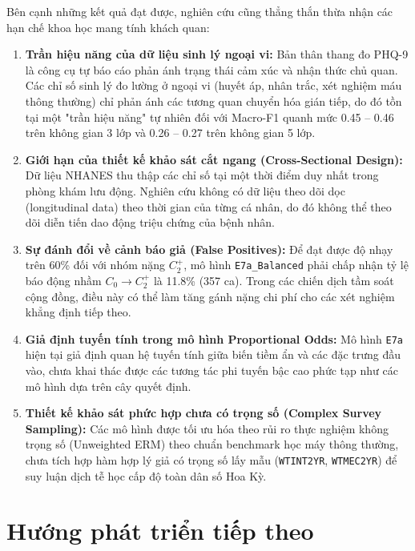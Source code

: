 Bên cạnh những kết quả đạt được, nghiên cứu cũng thẳng thắn thừa nhận các hạn chế khoa học mang tính khách quan:
\begin{enumerate}
    \item \textbf{Trần hiệu năng của dữ liệu sinh lý ngoại vi:} Bản thân thang đo PHQ-9 là công cụ tự báo cáo phản ánh trạng thái cảm xúc và nhận thức chủ quan. Các chỉ số sinh lý đo lường ở ngoại vi (huyết áp, nhân trắc, xét nghiệm máu thông thường) chỉ phản ánh các tương quan chuyển hóa gián tiếp, do đó tồn tại một "trần hiệu năng" tự nhiên đối với Macro-F1 quanh mức 0.45 -- 0.46 trên không gian 3 lớp và 0.26 -- 0.27 trên không gian 5 lớp.
    \item \textbf{Giới hạn của thiết kế khảo sát cắt ngang (Cross-Sectional Design):} Dữ liệu NHANES thu thập các chỉ số tại một thời điểm duy nhất trong phòng khám lưu động. Nghiên cứu không có dữ liệu theo dõi dọc (longitudinal data) theo thời gian của từng cá nhân, do đó không thể theo dõi diễn tiến dao động triệu chứng của bệnh nhân.
    \item \textbf{Sự đánh đổi về cảnh báo giả (False Positives):} Để đạt được độ nhạy trên 60\% đối với nhóm nặng $C_2^+$, mô hình \texttt{E7a\_Balanced} phải chấp nhận tỷ lệ báo động nhầm $C_0 \to C_2^+$ là 11.8\% (357 ca). Trong các chiến dịch tầm soát cộng đồng, điều này có thể làm tăng gánh nặng chi phí cho các xét nghiệm khẳng định tiếp theo.
    \item \textbf{Giả định tuyến tính trong mô hình Proportional Odds:} Mô hình \texttt{E7a} hiện tại giả định quan hệ tuyến tính giữa biến tiềm ẩn và các đặc trưng đầu vào, chưa khai thác được các tương tác phi tuyến bậc cao phức tạp như các mô hình dựa trên cây quyết định.
    \item \textbf{Thiết kế khảo sát phức hợp chưa có trọng số (Complex Survey Sampling):} Các mô hình được tối ưu hóa theo rủi ro thực nghiệm không trọng số (Unweighted ERM) theo chuẩn benchmark học máy thông thường, chưa tích hợp hàm hợp lý giả có trọng số lấy mẫu (\texttt{WTINT2YR}, \texttt{WTMEC2YR}) để suy luận dịch tễ học cấp độ toàn dân số Hoa Kỳ.
\end{enumerate}

\section{Hướng phát triển tiếp theo}
\label{sec:huong-phat-trien}

